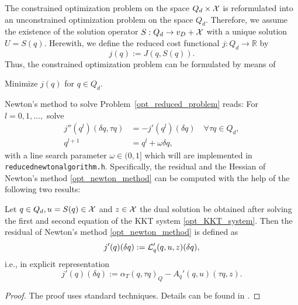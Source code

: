 \documentclass[prodmode,acmtoms]{acmsmall}
\numberwithin{equation}{section}
\begin{document}
%
The constrained optimization problem  on the space $Q_d\times {\cal X}$ 
is reformulated into an unconstrained optimization problem on the
space $Q_d$. Therefore, we assume the existence of the solution operator  
$S:Q_d\rightarrow {v_D+{\cal X}}$ with a unique solution
$U=S(q)$. Herewith, we define the reduced cost functional
$j:Q_d\rightarrow \mathbb{R}$ by 
%
\begin{equation}
  \label{opt_reduced_functional}
  j(q) := J(q,S(q)) .
\end{equation}
%
Thus, the constrained optimization problem can be formulated by means
of  
%
\begin{defi}
  \label{opt_reduced_problem}
  Minimize $j(q)$ for $q\in Q_d$.
\end{defi}
%
Newton's method to solve Problem~\ref{opt_reduced_problem} reads:
For $l=0,1,\ldots,$ solve
\begin{equation}
\label{opt_newton_method}
\begin{aligned}
j''(q^l)(\delta q , \tau q) &= -j'(q^l)(\delta q) 
\quad\forall\tau q\in Q_d, \\
q^{l+1} &= q^l + \omega\delta q,
\end{aligned} 
\end{equation}
with a line search parameter $\omega\in (0,1]$ which 
will are implemented in \texttt{reducednewtonalgorithm.h}.
Specifically, the residual and the Hessian of Newton's method 
\eqref{opt_newton_method}
can be computed with the help of the following two results:
\begin{proposition}
\label{prop_newton_residual}
Let $q\in Q_d, u=S(q)\in {\cal X}$
and $z\in {\cal X}$ the dual solution be obtained after solving 
the first and second equation of the KKT system 
\eqref{opt_KKT_system}. 
Then the residual of Newton's method \eqref{opt_newton_method} 
is defined as
\begin{equation*}
j'(q)(\delta q) := {\cal L}'_{q}(q,u,z)(\delta q),
\end{equation*}
i.e., in explicit representation
\begin{equation*}
j'(q)(\delta q) := \alpha_T (q , \tau q)_Q - 
A_{q}'(q,u)(\tau q , z).
\end{equation*}
\end{proposition}
\begin{proof}
The proof uses standard techniques. Details can be found in  
\cite{BeMeVe06}.
\end{proof}
\end{document}

